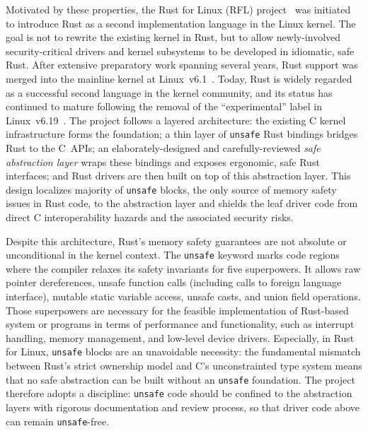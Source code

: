 \documentclass[conference]{IEEEtran}
\begin{document}
Motivated by these properties, the Rust for Linux (RFL) project~\cite{TODO:ojeda2022rust, TODO:rustforlinux} was initiated to introduce Rust as a second implementation language in the Linux kernel. The goal is not to rewrite the existing kernel in Rust, but to allow newly-involved security-critical drivers and kernel subsystems to be developed in idiomatic, safe Rust.
After extensive preparatory work spanning several years, Rust support was merged into the mainline kernel at Linux~v6.1~\cite{TODO:linux_v6.1}. Today, Rust is widely regarded as a successful second language in the kernel community, and its status has continued to mature following the removal of the ``experimental'' label in Linux~v6.19~\cite{TODO:linux_v6.19}.
The project follows a layered architecture: the existing C kernel infrastructure forms the foundation; a thin layer of \texttt{unsafe} Rust bindings bridges Rust to the C~APIs; an elaborately-designed and carefully-reviewed \emph{safe abstraction layer} wraps these bindings and exposes ergonomic, safe Rust interfaces; and Rust drivers are then built on top of this abstraction layer.
This design localizes majority of \texttt{unsafe} blocks, the only source of memory safety issues in Rust code, to the abstraction layer and shields the leaf driver code from direct C interoperability hazards and the associated security risks.

Despite this architecture, Rust's memory safety guarantees are not absolute or unconditional in the kernel context. 
The \texttt{unsafe} keyword marks code regions where the compiler relaxes its safety invariants for five superpowers.
It allows raw pointer dereferences, unsafe function calls (including calls to foreign language interface), mutable static variable access, unsafe casts, and union field operations.
Those superpowers are necessary for the feasible implementation of Rust-based system or programs in terms of performance and functionality, such as interrupt handling, memory management, and low-level device drivers.
Especially, in Rust for Linux, \texttt{unsafe} blocks are an unavoidable necessity: the fundamental mismatch between Rust's strict ownership model and C's unconstrainted type system means that no safe abstraction can be built without an \texttt{unsafe} foundation.
The project therefore adopts a discipline: \texttt{unsafe} code should be confined to the abstraction layers with rigorous documentation and review process, so that driver code above can remain \texttt{unsafe}-free.
\end{document}
